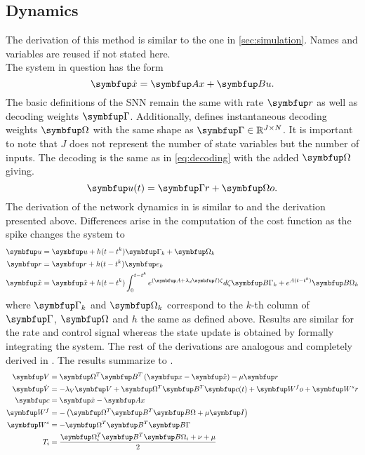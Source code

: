 \subsection{Dynamics}
The derivation of this method is similar to the one in \cref{sec:simulation}. Names and variables are reused if not stated here.\\
The system in question has the form
\begin{equation}\label{eq:contsys}
	\bmu{\dot{x}} = \bmu{Ax} + \bmu{Bu}.
\end{equation}
The basic definitions of the \ac{SNN} remain the same with rate $\bmu{r}$ as well as decoding weights $\bmu{\Gamma}$. Additionally, \cite{huang_optimizing_2017} defines instantaneous decoding weights $\bmu{\Omega}$ with the same shape as $\bmu{\Gamma}\in \mathbb{R}^{J\times N}$. It is important to note that $J$ does not represent the number of state variables but the number of inputs. The decoding is the same as in \cref{eq:decoding} with the added $\bmu{\Omega}$ giving.
\begin{equation}
	\bmu{u}(t) = \bmu{\Gamma r} + \bmu{\Omega o}.
\end{equation}
The derivation of the network dynamics in \cite{huang_dynamics_2019} is similar to \cite{boerlin_predictive_2013} and the derivation presented above. Differences arise in the computation of the cost function as the spike changes the system to
\begin{equation}\label{eq:control_spike_change}
	\begin{aligned}
	\bmu{u} &= \bmu{u} + h(t-t^k)\bmu{\Gamma}_k + \bmu{\Omega}_k\\
	\bmu{r} &= \bmu{r} + h(t-t^k)\bmu{e}_k\\
	\bmu{\hat{x}} &= \bmu{\hat{x}} + h(t-t^k)\int_{0}^{t-t^k}e^{(\bmu{A}+\lambda_d\bmu{I})\zeta}d\zeta \bmu{B\Gamma}_k + e^{A(t-t^k)}\bmu{B\Omega}_k
	\end{aligned}
\end{equation}
where $\bmu{\Gamma}_k$ and $\bmu{\Omega}_k$ correspond to the $k$-th column of $\bmu{\Gamma}$, $\bmu{\Omega}$ and $h$ the same as defined above. Results are similar for the rate and control signal whereas the state update is obtained by formally integrating the system. The rest of the derivations are analogous and completely derived in \cite{huang_optimizing_2017}. The results summarize to .
\begin{align}
	\bmu{V} &= \bmu{\Omega}^T\bmu{B}^T\left(\bmu{x} -\bmu{\hat{x}}\right) - \mu \bmu{r}\label{eq:control_dyn_begin}\\
	\bmu{\dot{V}} &= -\lambda_V\bmu{V} + \bmu{\Omega}^T \bmu{B}^T \bmu{c}(t) + \bmu{W^fo} + \bmu{W^sr}\label{eq:control_dyn_2}\\
	\bmu{c} &= \bmu{\dot{x}} - \bmu{Ax}\\
	\bmu{W^f} &= - \left(\bmu{\Omega}^T\bmu{B}^T\bmu{B\Omega} + \mu\bmu{I}\right)\\
	\bmu{W^s} &= -\bmu{\Omega}^T\bmu{B}^T\bmu{B\Gamma}\\
	T_i &= \frac{\bmu{\Omega}_i^T\bmu{B}^T\bmu{B\Omega}_i + \nu  + \mu}{2}
	\label{eq:control_dyn_end}
\end{align}
